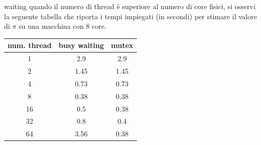 \documentclass[10pt, letterpaper]{report}
\begin{document}
waiting quando il numero di thread 
è superiore al numero di core fisici, si osservi la seguente tabella che riporta i tempi 
impiegati (in secondi) per stimare il valore di $\pi$ su una macchina con 8 core.\begin{center}
    \begin{tabular}{c|c|c}
        \rowcolor[HTML]{FFFFC7} 
        num. thread & busy waiting & mutex \\ \hline
        \rowcolor[HTML]{ECF4FF} 
        1           & 2.9          & 2.9   \\
        \rowcolor[HTML]{EFEFEF} 
        2           & 1.45         & 1.45  \\
        \rowcolor[HTML]{ECF4FF} 
        4           & 0.73         & 0.73  \\
        \rowcolor[HTML]{EFEFEF} 
        8           & 0.38         & 0.38  \\
        \rowcolor[HTML]{ECF4FF} 
        16          & 0.5          & 0.38  \\
        \rowcolor[HTML]{EFEFEF} 
        32          & 0.8          & 0.4   \\
        \rowcolor[HTML]{ECF4FF} 
        64          & 3.56         & 0.38 
        \end{tabular}
\end{center}
\end{document}
